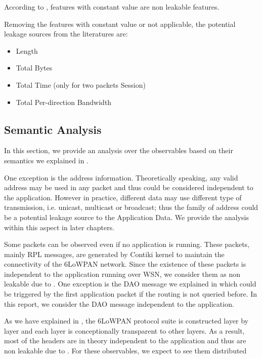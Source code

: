 According to , features with constant value are non leakable features. 

Removing the features with constant value or not applicable, the potential leakage sources from the literatures are:
\begin{itemize}
	\item Length
	\item Total Bytes
	\item Total Time (only for two packets Session)
	\item Total Per-direction Bandwidth
\end{itemize}


\subsection{Semantic Analysis}

In this section, we provide an analysis over the observables based on their semantics we explained in .

One exception is the address information. Theoretically speaking, any valid address may be used in any packet and thus could be considered independent to the application. However in practice, different data may use different type of transmission, i.e. unicast, multicast or broadcast; thus the family of address could be a potential leakage source to the Application Data. We provide the analysis within this aspect in later chapters.

Some packets can be observed even if no application is running. These packets, mainly RPL messages, are generated by Contiki kernel to maintain the connectivity of the 6LoWPAN network. Since the existence of these packets is independent to the application running over WSN, we consider them as non leakable due to . One exception is the DAO message we explained in  which could be triggered by the first application packet if the routing is not queried before. In this report, we consider the DAO message independent to the application.

As we have explained in , the 6LoWPAN protocol suite is constructed layer by layer and each layer is conceptionally transparent to other layers. As a result, most of the headers are in theory independent to the application and thus are non leakable due to . For these observables, we expect to see them distributed independently among different applications. Specifically, the choice of cryptographic key is expected to be independent to all contents in the headers.

